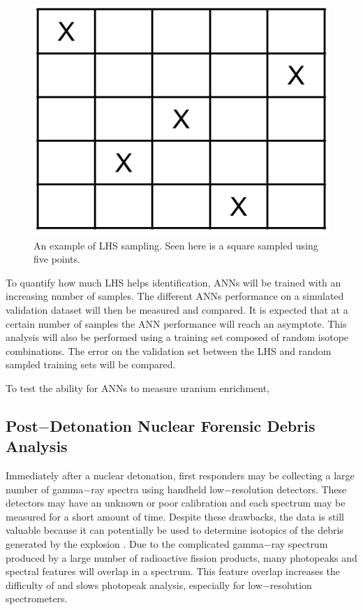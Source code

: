 \documentclass[tocnosub,noragright,centerchapter,12pt,fullpage]{uiucecethesis09}
\begin{document}
\begin{figure}[H]
\centering
\includegraphics[width=0.5\linewidth]{images/LHS_example}
\caption{An example of LHS sampling. Seen here is a square sampled using five points.}
\label{fig:LHS_example}
\end{figure}

To quantify how much LHS helps identification, ANNs will be trained with an increasing number of samples. The different ANNs performance on a simulated validation dataset will then be measured and compared. It is expected that at a certain number of samples the ANN performance will reach an asymptote. This analysis will also be performed using a training set composed of random isotope combinations. The error on the validation set between the LHS and random sampled training sets will be compared.  


To test the ability for ANNs to measure uranium enrichment, 


\subsection{Post$-$Detonation Nuclear Forensic Debris Analysis}

Immediately after a nuclear detonation, first responders may be collecting a large number of gamma$-$ray spectra using handheld low$-$resolution detectors. These detectors may have an unknown or poor calibration and each spectrum may be measured for a short amount of time. Despite these drawbacks, the data is still valuable because it can potentially be used to determine isotopics of the debris generated by the explosion \cite{Moody}. Due to the complicated gamma$-$ray spectrum produced by a large number of radioactive fission products, many photopeaks and spectral features will overlap in a spectrum. This feature overlap increases the difficulty of and slows photopeak analysis, especially for low$-$resolution spectrometers. 
\end{document}
